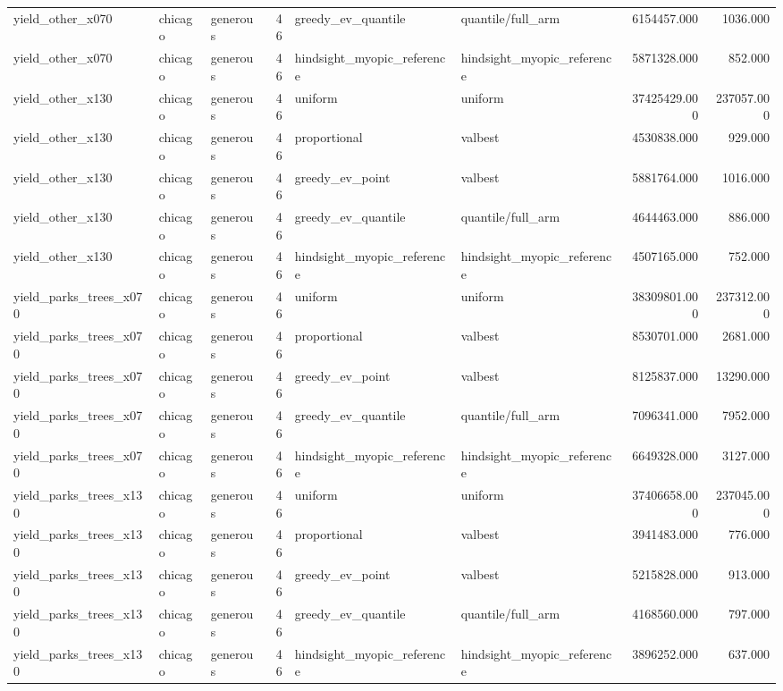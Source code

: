 \begin{tabular}{lllrllrr}
yield\_other\_x070 & chicago & generous & 46 & greedy\_ev\_quantile & quantile/full\_arm & 6154457.000 & 1036.000 \\
yield\_other\_x070 & chicago & generous & 46 & hindsight\_myopic\_reference & hindsight\_myopic\_reference & 5871328.000 & 852.000 \\
yield\_other\_x130 & chicago & generous & 46 & uniform & uniform & 37425429.000 & 237057.000 \\
yield\_other\_x130 & chicago & generous & 46 & proportional & valbest & 4530838.000 & 929.000 \\
yield\_other\_x130 & chicago & generous & 46 & greedy\_ev\_point & valbest & 5881764.000 & 1016.000 \\
yield\_other\_x130 & chicago & generous & 46 & greedy\_ev\_quantile & quantile/full\_arm & 4644463.000 & 886.000 \\
yield\_other\_x130 & chicago & generous & 46 & hindsight\_myopic\_reference & hindsight\_myopic\_reference & 4507165.000 & 752.000 \\
yield\_parks\_trees\_x070 & chicago & generous & 46 & uniform & uniform & 38309801.000 & 237312.000 \\
yield\_parks\_trees\_x070 & chicago & generous & 46 & proportional & valbest & 8530701.000 & 2681.000 \\
yield\_parks\_trees\_x070 & chicago & generous & 46 & greedy\_ev\_point & valbest & 8125837.000 & 13290.000 \\
yield\_parks\_trees\_x070 & chicago & generous & 46 & greedy\_ev\_quantile & quantile/full\_arm & 7096341.000 & 7952.000 \\
yield\_parks\_trees\_x070 & chicago & generous & 46 & hindsight\_myopic\_reference & hindsight\_myopic\_reference & 6649328.000 & 3127.000 \\
yield\_parks\_trees\_x130 & chicago & generous & 46 & uniform & uniform & 37406658.000 & 237045.000 \\
yield\_parks\_trees\_x130 & chicago & generous & 46 & proportional & valbest & 3941483.000 & 776.000 \\
yield\_parks\_trees\_x130 & chicago & generous & 46 & greedy\_ev\_point & valbest & 5215828.000 & 913.000 \\
yield\_parks\_trees\_x130 & chicago & generous & 46 & greedy\_ev\_quantile & quantile/full\_arm & 4168560.000 & 797.000 \\
yield\_parks\_trees\_x130 & chicago & generous & 46 & hindsight\_myopic\_reference & hindsight\_myopic\_reference & 3896252.000 & 637.000 \\

\end{tabular}
